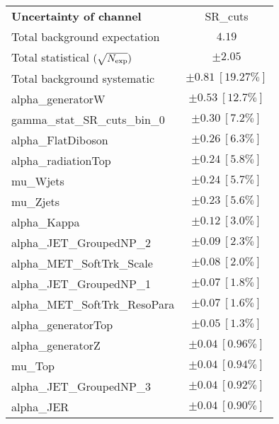 
\begin{table}
\begin{center}
\setlength{\tabcolsep}{0.0pc}
\begin{tabular*}{\textwidth}{@{\extracolsep{\fill}}lc}
\noalign{\smallskip}\hline\noalign{\smallskip}
{\bf Uncertainty of channel}                                    & SR\_cuts            \\
\noalign{\smallskip}\hline\noalign{\smallskip}
Total background expectation             &  $4.19$       \\
\noalign{\smallskip}\hline\noalign{\smallskip}
Total statistical $(\sqrt{N_{\rm exp}})$              & $\pm 2.05$       \\
Total background systematic               & $\pm 0.81\ [19.27\%] $             \\
\noalign{\smallskip}\hline\noalign{\smallskip}
\noalign{\smallskip}\hline\noalign{\smallskip}
alpha\_generatorW         & $\pm 0.53\ [12.7\%] $       \\
gamma\_stat\_SR\_cuts\_bin\_0         & $\pm 0.30\ [7.2\%] $       \\
alpha\_FlatDiboson         & $\pm 0.26\ [6.3\%] $       \\
alpha\_radiationTop         & $\pm 0.24\ [5.8\%] $       \\
mu\_Wjets         & $\pm 0.24\ [5.7\%] $       \\
mu\_Zjets         & $\pm 0.23\ [5.6\%] $       \\
alpha\_Kappa         & $\pm 0.12\ [3.0\%] $       \\
alpha\_JET\_GroupedNP\_2         & $\pm 0.09\ [2.3\%] $       \\
alpha\_MET\_SoftTrk\_Scale         & $\pm 0.08\ [2.0\%] $       \\
alpha\_JET\_GroupedNP\_1         & $\pm 0.07\ [1.8\%] $       \\
alpha\_MET\_SoftTrk\_ResoPara         & $\pm 0.07\ [1.6\%] $       \\
alpha\_generatorTop         & $\pm 0.05\ [1.3\%] $       \\
alpha\_generatorZ         & $\pm 0.04\ [0.96\%] $       \\
mu\_Top         & $\pm 0.04\ [0.94\%] $       \\
alpha\_JET\_GroupedNP\_3         & $\pm 0.04\ [0.92\%] $       \\
alpha\_JER         & $\pm 0.04\ [0.90\%] $       \\

\end{tabular*}
\end{center}
\end{table}
